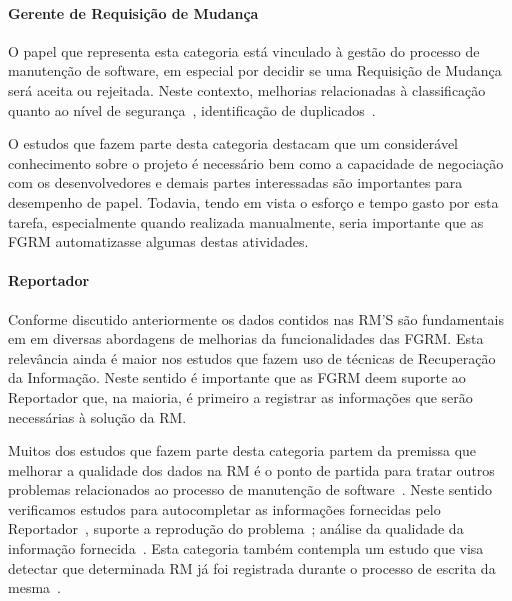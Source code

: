 \paragraph{Gerente de Requisição de	Mudança}
O papel que representa esta categoria está vinculado à gestão do processo de
manutenção de software, em especial por decidir se uma Requisição de Mudança
será aceita ou rejeitada. Neste contexto, melhorias relacionadas à classificação
quanto ao nível de segurança~\cite{gegick2010identifying, zhang2011bug,
	ValdiviaGarcia:2014:CPB:2597073.2597099}, identificação de
duplicados~\cite{hindle2016contextual, sun2010discriminative,
	alipour2013contextual, banerjee2012automated}. 

O estudos que fazem parte desta categoria destacam que um considerável
conhecimento sobre o projeto é necessário bem como  a capacidade de negociação
com os desenvolvedores e demais partes interessadas são importantes para
desempenho de papel. Todavia, tendo em vista o esforço e tempo gasto por esta
tarefa, especialmente quando realizada manualmente, seria importante que as FGRM
automatizasse algumas destas atividades.

\paragraph{Reportador}
Conforme discutido anteriormente os dados contidos nas RM'S são fundamentais em
em diversas abordagens de melhorias da funcionalidades das FGRM. Esta relevância
ainda é maior nos estudos que fazem uso de técnicas de Recuperação da
Informação. Neste sentido é importante que as FGRM deem suporte ao Reportador
que, na maioria, é primeiro a registrar as informações que serão necessárias à
solução da RM. 

Muitos dos estudos que fazem parte desta categoria  partem da premissa que
melhorar a qualidade dos dados na RM é o ponto de partida para tratar outros
problemas relacionados ao processo de manutenção de
software~\cite{moran2015auto, Moran:2015:EAA:2786805.2807557, Bettenburg2008a}.
Neste sentido verificamos estudos para autocompletar as informações fornecidas
pelo Reportador~\cite{moran2015auto}, suporte a reprodução do
problema~\cite{Moran:2015:EAA:2786805.2807557}; análise da qualidade da
informação fornecida~\cite{Bettenburg2008a, Tu:2014:MQI:2677832.2677844}. Esta
categoria também contempla um estudo que visa detectar que determinada RM já foi
registrada durante o processo de escrita da mesma~\cite{Thung2014}.
